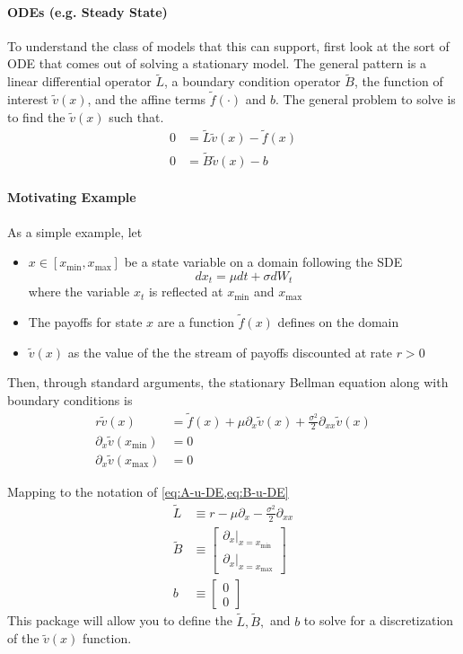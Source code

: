 \documentclass[11pt]{article}
\newcommand{\D}[1][]{\ensuremath{\partial_{#1}}}
\theoremstyle{definition}
\begin{document}
\paragraph{ODEs (e.g. Steady State)}
To understand the class of models that this can support, first look at the sort of ODE that comes out of solving a stationary model.  The general pattern is a linear differential operator $\tilde{L}$, a boundary condition operator $\tilde{B}$, the function of interest $\tilde{v}(x)$, and the affine terms $\tilde{f}(\cdot)$ and $b$. The general problem to solve is to find the $\tilde{v}(x)$ such that.
\begin{align}
	0 &= \tilde{L} \tilde{v}(x) - \tilde{f}(x)\label{eq:A-u-DE}\\
	0 &= \tilde{B} \tilde{v}(x) - b\label{eq:B-u-DE}
\end{align}

\paragraph{Motivating Example}
As a simple example, let
\begin{itemize}
	\item $x \in [x_{\min},x_{\max}]$ be a state variable on a domain following the SDE
	$$d x_t = \mu d t + \sigma d W_t$$
	where the variable $x_t$ is reflected at $x_{\min}$ and $x_{\max}$
	\item The payoffs for state $x$ are a function $\tilde{f}(x)$ defines on the domain
	\item $\tilde{v}(x)$ as the value of the the stream of payoffs discounted at rate $r > 0$
\end{itemize}
Then, through standard arguments, the stationary Bellman equation along with boundary conditions is
\begin{align}
	r \tilde{v}(x) &= \tilde{f}(x) + \mu \D[x] \tilde{v}(x) + \frac{\sigma^2}{2} \D[xx]\tilde{v}(x)\\
	\D[x]\tilde{v}(x_{\min}) &= 0\\
	\D[x] \tilde{v}(x_{\max}) &= 0
\end{align}

\noindent Mapping to the notation of \cref{eq:A-u-DE,eq:B-u-DE}
\begin{align}
	\tilde{L} &\equiv r - \mu \D[x] - \frac{\sigma^2}{2}\D[xx]\\
	\tilde{B} &\equiv \begin{bmatrix}
	\partial_x\vert_{x = x_{\min}}\\
	\partial_x\vert_{x = x_{\max}}
\end{bmatrix}\\
b &\equiv \begin{bmatrix} 0\\ 0 \end{bmatrix}
\end{align}
This package will allow you to define the $\tilde{L},\tilde{B},$ and $b$ to solve for a discretization of the $\tilde{v}(x)$ function.
\end{document}
